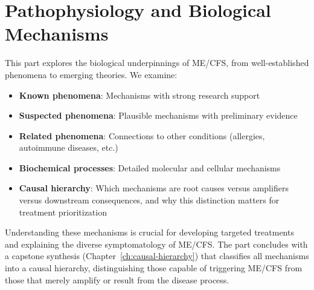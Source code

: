 \part{Pathophysiology and Biological Mechanisms}
\label{part:pathophysiology}

This part explores the biological underpinnings of ME/CFS, from well-established phenomena to emerging theories. We examine:

\begin{itemize}
\item \textbf{Known phenomena}: Mechanisms with strong research support
\item \textbf{Suspected phenomena}: Plausible mechanisms with preliminary evidence
\item \textbf{Related phenomena}: Connections to other conditions (allergies, autoimmune diseases, etc.)
\item \textbf{Biochemical processes}: Detailed molecular and cellular mechanisms
\item \textbf{Causal hierarchy}: Which mechanisms are root causes versus amplifiers versus downstream consequences, and why this distinction matters for treatment prioritization
\end{itemize}

Understanding these mechanisms is crucial for developing targeted treatments and explaining the diverse symptomatology of ME/CFS. The part concludes with a capstone synthesis (Chapter~\ref{ch:causal-hierarchy}) that classifies all mechanisms into a causal hierarchy, distinguishing those capable of triggering ME/CFS from those that merely amplify or result from the disease process.

